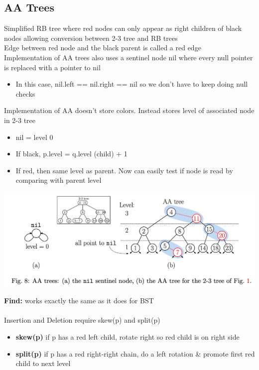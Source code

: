 \documentclass{article}
\begin{document}
  \subsection{AA Trees}
  Simplified RB tree where red nodes can only appear as right children of black nodes allowing conversion between 2-3 tree and RB trees \\
  Edge between red node and the black parent is called a red edge \\
  Implementation of AA trees also uses a sentinel node nil where every null pointer is replaced with a pointer to nil
  \begin{itemize}[noitemsep]
  \item In this case, nil.left == nil.right == nil so we don't have to keep doing null checks
  \end{itemize}
  Implementation of AA doesn't store colors. Instead stores level of associated node in 2-3 tree
  \begin{itemize}[noitemsep]
  \item nil = level 0
  \item If black, p.level = q.level (child) + 1
  \item If red, then same level as parent. Now can easily test if node is read by comparing with parent level
  \end{itemize}
  \begin{center}
  \includegraphics[scale=0.20]{AATree}
  \end{center}
  \textbf{Find: }works exactly the same as it does for BST \\ \\
  Insertion and Deletion require skew(p) and split(p)
  \begin{itemize}[noitemsep]
    \item \textbf{skew(p)} if p has a red left child, rotate right so red child is on right side
    \item \textbf{split(p)} if p has a red right-right chain, do a left rotation \& promote first red child to next level
  \end{itemize}
\end{document}
